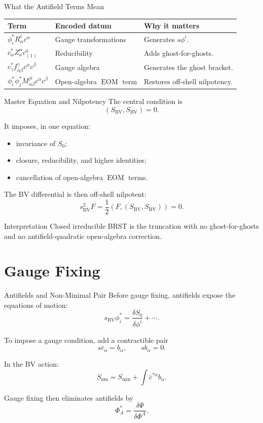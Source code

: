 \documentclass[aspectratio=169,professionalfonts]{beamer}
\newcommand{\EOM}{\ensuremath{\operatorname{EOM}}}
\newcommand{\BV}{\ensuremath{S_{\mathrm{BV}}}}
\begin{document}
\begin{frame}{What the Antifield Terms Mean}
  \small
  \begin{tabular}{>{\raggedright\arraybackslash}p{}
                  >{\raggedright\arraybackslash}p{}
                  >{\raggedright\arraybackslash}p{}}
    \toprule
    Term & Encoded datum & Why it matters \\
    \midrule
    $\phi_i^*R^i_\alpha c^\alpha$ &
    Gauge transformations &
    Generates $s\phi^i$. \\
    $c_\alpha^*Z^\alpha_a c^a_{(1)}$ &
    Reducibility &
    Adds ghost-for-ghosts. \\
    $c_\gamma^*f^\gamma_{\alpha\beta}c^\alpha c^\beta$ &
    Gauge algebra &
    Generates the ghost bracket. \\
    $\phi_i^*\phi_j^*M^{ji}_{\alpha\beta}c^\alpha c^\beta$ &
    Open-algebra \EOM{} term &
    Restores off-shell nilpotency. \\
    \bottomrule
  \end{tabular}
\end{frame}

\begin{frame}{Master Equation and Nilpotency}
  The central condition is
  \[
    (\BV,\BV)=0 .
  \]

  It imposes, in one equation:
  \begin{itemize}
    \item invariance of $S_0$;
    \item closure, reducibility, and higher identities;
    \item cancellation of open-algebra \EOM{} terms.
  \end{itemize}

  The BV differential is then off-shell nilpotent:
  \[
    s_{\mathrm{BV}}^2F
    =\frac12(F,(\BV,\BV))=0 .
  \]

  \begin{exampleblock}{Interpretation}
    Closed irreducible BRST is the truncation with no ghost-for-ghosts and no
    antifield-quadratic open-algebra correction.
  \end{exampleblock}
\end{frame}

\section{Gauge Fixing}

\begin{frame}{Antifields and Non-Minimal Pair}
  Before gauge fixing, antifields expose the equations of motion:
  \[
    s_{\mathrm{BV}}\phi_i^*
    =\frac{\delta S_0}{\delta\phi^i}+\cdots .
  \]

  To impose a gauge condition, add a contractible pair
  \[
    s\bar c_\alpha=b_\alpha,
    \qquad
    sb_\alpha=0 .
  \]

  In the BV action:
  \[
    S_{\mathrm{nm}}=S_{\min}+\int \bar c^{*\alpha}b_\alpha .
  \]

  Gauge fixing then eliminates antifields by
  \[
    \Phi_A^*=\frac{\delta\Psi}{\delta\Phi^A}.
  \]
\end{frame}
\end{document}
